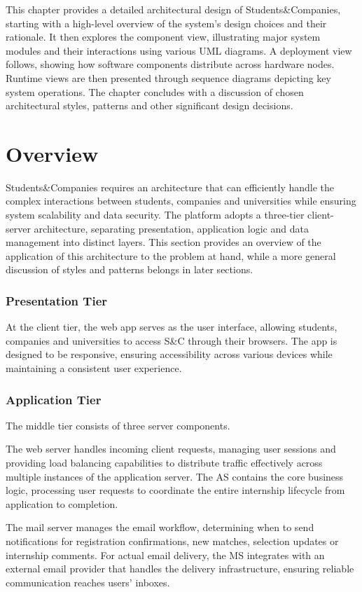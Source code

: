 This chapter provides a detailed architectural design of Students\&Companies, starting with a high-level overview of the system's design choices and their rationale.
It then explores the component view, illustrating major system modules and their interactions using various UML diagrams.
A deployment view follows, showing how software components distribute across hardware nodes.
Runtime views are then presented through sequence diagrams depicting key system operations.
The chapter concludes with a discussion of chosen architectural styles, patterns and other significant design decisions.

\section{Overview}
Students\&Companies requires an architecture that can efficiently handle the complex interactions between students, companies and universities while ensuring system scalability and data security.
The platform adopts a three-tier client-server architecture, separating presentation, application logic and data management into distinct layers.
This section provides an overview of the application of this architecture to the problem at hand, while a more general discussion of styles and patterns belongs in later sections.

\subsubsection{Presentation Tier}
At the client tier, the web app serves as the user interface, allowing students, companies and universities to access S\&C through their browsers.
The app is designed to be responsive, ensuring accessibility across various devices while maintaining a consistent user experience.

\subsubsection{Application Tier}
The middle tier consists of three server components.

The web server handles incoming client requests, managing user sessions and providing load balancing capabilities to distribute traffic effectively across multiple instances of the application server.
The AS contains the core business logic, processing user requests to coordinate the entire internship lifecycle from application to completion.

The mail server manages the email workflow, determining when to send notifications for registration confirmations, new matches, selection updates or internship comments.
For actual email delivery, the MS integrates with an external email provider that handles the delivery infrastructure, ensuring reliable communication reaches users' inboxes.

